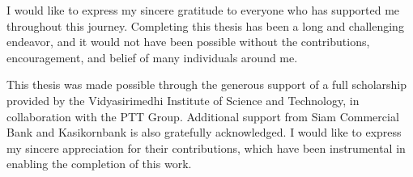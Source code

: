 I would like to express my sincere gratitude to everyone who has supported me throughout this journey. Completing this thesis has been a long and challenging endeavor, and it would not have been possible without the contributions, encouragement, and belief of many individuals around me.



This thesis was made possible through the generous support of a full scholarship provided by the Vidyasirimedhi Institute of Science and Technology, in collaboration with the PTT Group. Additional support from Siam Commercial Bank and Kasikornbank is also gratefully acknowledged. I would like to express my sincere appreciation for their contributions, which have been instrumental in enabling the completion of this work.



